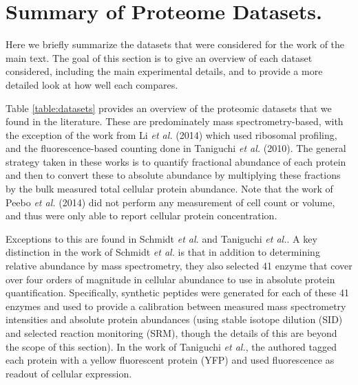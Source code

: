 

\section{Summary of Proteome Datasets.} 

Here we briefly summarize the datasets that were considered for the work of the main
text. The goal of this section is to give an overview of each dataset
considered, including the main experimental details, and to provide a more
detailed look at how well each compares.

Table \ref{table:datasets} provides an overview of the proteomic datasets that
we found in the literature. These are predominately mass spectrometry-based,
with the exception of the work from Li \textit{et al.} (2014) which used ribosomal
profiling, and the fluorescence-based counting done in Taniguchi \textit{et al.}
(2010). The general strategy taken in these works is to quantify fractional
abundance of each protein and then to convert these to absolute abundance by
multiplying these fractions by the bulk measured total cellular protein
abundance. Note that the work of Peebo \textit{et al.} (2014) did not perform any
measurement of cell count or volume, and thus were only able to report cellular
protein concentration.

Exceptions to this are found in Schmidt \textit{et al.} and Taniguchi \textit{et al.}.
A key distinction in the work of Schmidt \textit{et al.} is that in addition to
determining relative abundance by mass spectrometry, they also selected 41
enzyme that cover over four orders of magnitude in cellular abundance to use in
absolute protein quantification. Specifically, synthetic peptides were generated
for each of these 41 enzymes and used to provide a calibration between measured
mass spectrometry intensities and absolute protein abundances (using stable
isotope dilution (SID) and selected reaction monitoring (SRM), though the
details of this are beyond the scope of this section). In the work of Taniguchi
\textit{et al.},  the authored tagged each protein with a  yellow fluorescent
protein (YFP) and used fluorescence as readout of cellular expression.


